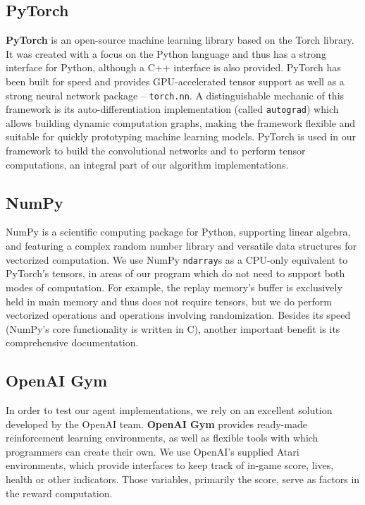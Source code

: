 \subsection*{PyTorch}
\textbf{PyTorch} is an open-source machine learning library based on the Torch library.
It was created with a focus on the Python language \cite{pytorch-book} and thus has a strong interface for Python, although a C++ interface is also provided.
PyTorch has been built for speed and provides GPU-accelerated tensor support as well as a strong neural network package -- \verb|torch.nn|.
A distinguishable mechanic of this framework is its auto-differentiation implementation (called \texttt{autograd}) which allows building dynamic computation graphs, making the framework flexible and suitable for quickly prototyping machine learning models.
PyTorch is used in our framework to build the convolutional networks and to perform tensor computations, an integral part of our algorithm implementations.

\subsection*{NumPy}
NumPy is a scientific computing package for Python, supporting linear algebra, and featuring a complex random number library and versatile data structures for vectorized computation.
We use NumPy \verb|ndarray|s as a CPU-only equivalent to PyTorch's tensors, in areas of our program which do not need to support both modes of computation.
For example, the replay memory's buffer is exclusively held in main memory and thus does not require tensors, but we do perform vectorized operations and operations involving randomization.
Besides its speed (NumPy's core functionality is written in C), another important benefit is its comprehensive documentation.

\subsection*{OpenAI Gym}
In order to test our agent implementations, we rely on an excellent solution developed by the OpenAI team.
\textbf{OpenAI Gym} \cite{openai-gym} provides ready-made reinforcement learning environments, as well as flexible tools with which programmers can create their own.
We use OpenAI's supplied Atari environments, which provide interfaces to keep track of in-game score, lives, health or other indicators.
Those variables, primarily the score, serve as factors in the reward computation.

